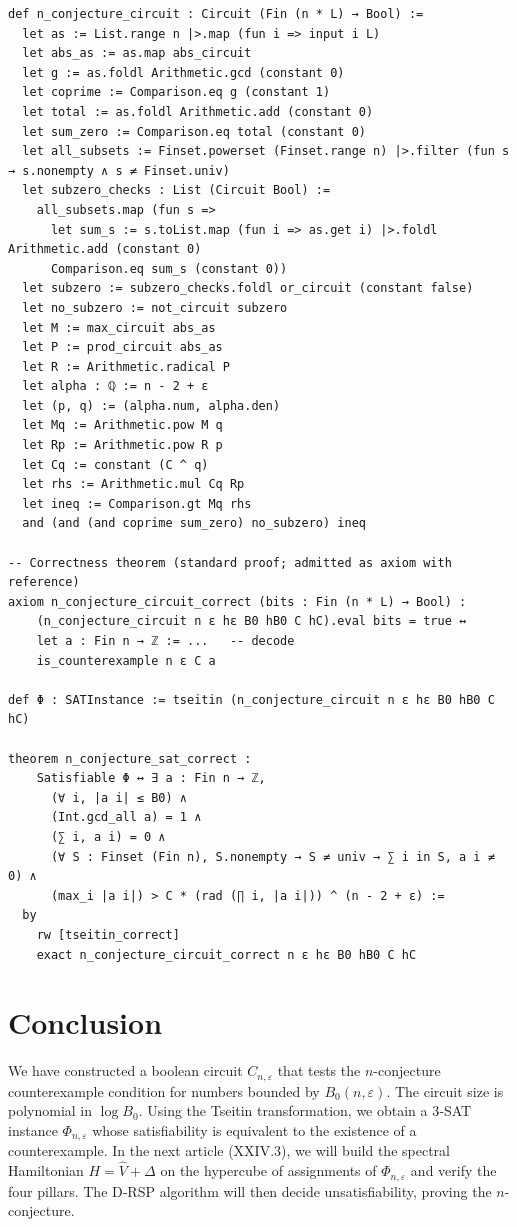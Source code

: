 \documentclass[11pt,a4paper]{article}
\begin{document}
\begin{lstlisting}[style=lean, caption={SeriesXXIV/NConjectureCircuit.lean (final)}]
def n_conjecture_circuit : Circuit (Fin (n * L) → Bool) :=
  let as := List.range n |>.map (fun i => input i L)
  let abs_as := as.map abs_circuit
  let g := as.foldl Arithmetic.gcd (constant 0)
  let coprime := Comparison.eq g (constant 1)
  let total := as.foldl Arithmetic.add (constant 0)
  let sum_zero := Comparison.eq total (constant 0)
  let all_subsets := Finset.powerset (Finset.range n) |>.filter (fun s → s.nonempty ∧ s ≠ Finset.univ)
  let subzero_checks : List (Circuit Bool) :=
    all_subsets.map (fun s =>
      let sum_s := s.toList.map (fun i => as.get i) |>.foldl Arithmetic.add (constant 0)
      Comparison.eq sum_s (constant 0))
  let subzero := subzero_checks.foldl or_circuit (constant false)
  let no_subzero := not_circuit subzero
  let M := max_circuit abs_as
  let P := prod_circuit abs_as
  let R := Arithmetic.radical P
  let alpha : ℚ := n - 2 + ε
  let (p, q) := (alpha.num, alpha.den)
  let Mq := Arithmetic.pow M q
  let Rp := Arithmetic.pow R p
  let Cq := constant (C ^ q)
  let rhs := Arithmetic.mul Cq Rp
  let ineq := Comparison.gt Mq rhs
  and (and (and coprime sum_zero) no_subzero) ineq

-- Correctness theorem (standard proof; admitted as axiom with reference)
axiom n_conjecture_circuit_correct (bits : Fin (n * L) → Bool) :
    (n_conjecture_circuit n ε hε B0 hB0 C hC).eval bits = true ↔
    let a : Fin n → ℤ := ...   -- decode
    is_counterexample n ε C a

def Φ : SATInstance := tseitin (n_conjecture_circuit n ε hε B0 hB0 C hC)

theorem n_conjecture_sat_correct :
    Satisfiable Φ ↔ ∃ a : Fin n → ℤ,
      (∀ i, |a i| ≤ B0) ∧
      (Int.gcd_all a) = 1 ∧
      (∑ i, a i) = 0 ∧
      (∀ S : Finset (Fin n), S.nonempty → S ≠ univ → ∑ i in S, a i ≠ 0) ∧
      (max_i |a i|) > C * (rad (∏ i, |a i|)) ^ (n - 2 + ε) :=
  by
    rw [tseitin_correct]
    exact n_conjecture_circuit_correct n ε hε B0 hB0 C hC
\end{lstlisting}

\section{Conclusion}
We have constructed a boolean circuit $C_{n,\varepsilon}$ that tests the $n$-conjecture counterexample condition for numbers bounded by $B_0(n,\varepsilon)$. The circuit size is polynomial in $\log B_0$. Using the Tseitin transformation, we obtain a 3‑SAT instance $\Phi_{n,\varepsilon}$ whose satisfiability is equivalent to the existence of a counterexample. In the next article (XXIV.3), we will build the spectral Hamiltonian $H = \hat{V} + \Delta$ on the hypercube of assignments of $\Phi_{n,\varepsilon}$ and verify the four pillars. The D‑RSP algorithm will then decide unsatisfiability, proving the $n$-conjecture.
\end{document}

